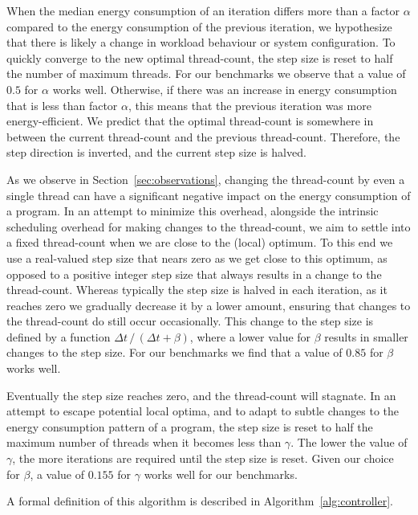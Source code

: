 When the median energy consumption of an iteration differs more than a factor $\alpha$ compared to
the energy consumption of the previous iteration, we hypothesize that there is likely a change in
workload behaviour or system configuration. To quickly converge to the new optimal thread-count, the
step size is reset to half the number of maximum threads. For our benchmarks we observe that a value
of $0.5$ for $\alpha$ works well. Otherwise, if there was an increase in energy consumption that is
less than factor $\alpha$, this means that the previous iteration was more energy-efficient. We
predict that the optimal thread-count is somewhere in between the current thread-count and the
previous thread-count. Therefore, the step direction is inverted, and the current step size is
halved.

As we observe in Section~\ref{sec:observations}, changing the thread-count by even a single thread
can have a significant negative impact on the energy consumption of a program. In an attempt to
minimize this overhead, alongside the intrinsic scheduling overhead for making changes to the
thread-count, we aim to settle into a fixed thread-count when we are close to the (local) optimum.
To this end we use a real-valued step size that nears zero as we get close to this optimum, as
opposed to a positive integer step size that always results in a change to the thread-count. Whereas
typically the step size is halved in each iteration, as it reaches zero we gradually decrease it by
a lower amount, ensuring that changes to the thread-count do still occur occasionally. This change
to the step size is defined by a function $\Delta t\, /\, (\Delta t + \beta)$, where a lower value
for $\beta$ results in smaller changes to the step size. For our benchmarks we find that a value of
$0.85$ for $\beta$ works well.

Eventually the step size reaches zero, and the thread-count will stagnate. In an attempt to escape
potential local optima, and to adapt to subtle changes to the energy consumption pattern of a
program, the step size is reset to half the maximum number of threads when it becomes less than
$\gamma$. The lower the value of $\gamma$, the more iterations are required until the step size is
reset. Given our choice for $\beta$, a value of $0.155$ for $\gamma$ works well for our benchmarks.

A formal definition of this algorithm is described in Algorithm~\ref{alg:controller}.

